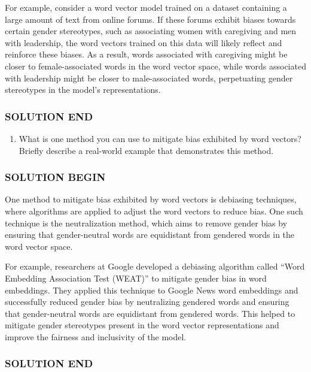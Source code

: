 \documentclass[11pt]{article}
\providecommand{\tightlist}{%
      \setlength{\itemsep}{0pt}\setlength{\parskip}{0pt}}
\begin{document}
For example, consider a word vector model trained on a dataset
containing a large amount of text from online forums. If these forums
exhibit biases towards certain gender stereotypes, such as associating
women with caregiving and men with leadership, the word vectors trained
on this data will likely reflect and reinforce these biases. As a
result, words associated with caregiving might be closer to
female-associated words in the word vector space, while words associated
with leadership might be closer to male-associated words, perpetuating
gender stereotypes in the model's representations.

\subsubsection{SOLUTION END}\label{solution-end}

    \begin{enumerate}
\def\labelenumi{\alph{enumi}.}
\setcounter{enumi}{1}
\tightlist
\item
  What is one method you can use to mitigate bias exhibited by word
  vectors? Briefly describe a real-world example that demonstrates this
  method.
\end{enumerate}

    \subsubsection{SOLUTION BEGIN}\label{solution-begin}

One method to mitigate bias exhibited by word vectors is debiasing
techniques, where algorithms are applied to adjust the word vectors to
reduce bias. One such technique is the neutralization method, which aims
to remove gender bias by ensuring that gender-neutral words are
equidistant from gendered words in the word vector space.

For example, researchers at Google developed a debiasing algorithm
called ``Word Embedding Association Test (WEAT)'' to mitigate gender
bias in word embeddings. They applied this technique to Google News word
embeddings and successfully reduced gender bias by neutralizing gendered
words and ensuring that gender-neutral words are equidistant from
gendered words. This helped to mitigate gender stereotypes present in
the word vector representations and improve the fairness and inclusivity
of the model.

\subsubsection{SOLUTION END}\label{solution-end}
\end{document}
